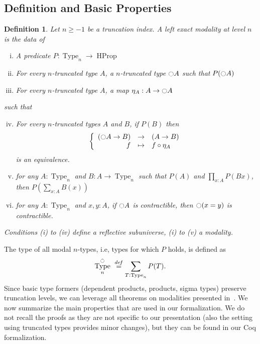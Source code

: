 \documentclass[conference]{IEEEtran}
\newtheorem{defi}[thm]{Definition}
\newcommand \defeq {\overset{de\hspace{-0.2ex}f}{=}}
\newcommand{\ie}{i.e,\xspace}
\DeclareMathOperator{\Type}{Type}
\DeclareMathOperator{\HProp}{HProp}
\newcommand{\modal}{\ensuremath{\ocircle}}
\begin{document}
\subsection{Definition and Basic Properties}
\label{sec:definition}

\begin{defi}
  \label{sec:defin-basic-prop-1}
  Let $n\geq -1$ be a truncation index. A left exact modality at level
  $n$ is the data of
  \begin{enumerate}[(i)]
  \item A predicate $P:\Type_n \to \HProp$
  \item For every $n$-truncated type $A$, a $n$-truncated type
    $\modal A$ such that $P(\modal A)$
  \item For every $n$-truncated type $A$, a map $\eta_A:A \to
    \modal A$
  \end{enumerate}
  such that
  \begin{enumerate}[(i)]
    \setcounter{enumi}{3}
  \item For every $n$-truncated types $A$ and $B$, if $P(B)$ then
    $$\left\{
      \begin{array}{rcl}
        (\modal A \to B) & \to & (A \to B) \\
        f & \mapsto & f \circ \eta_A
      \end{array} \right.$$
    is an equivalence.
  \item for any $A:\Type_n$ and $B:A \to \Type_n$ such that $P(A)$
    and $\prod_{x:A} P(B x)$, then $P\left( \sum_{x:A} B(x)\right)$
  \item for any $A:\Type_n$ and $x,y:A$, if $\modal A$ is
    contractible, then $\modal (x=y)$ is contractible.
  \end{enumerate}
  Conditions (i) to (iv) define a {\em reflective subuniverse}, (i) to
  (v) a {\em modality}.
\end{defi}

The type of all modal $n$-types, \ie types for which $P$ holds, is
defined as %
$$
\Type_n^\modal \ \defeq \sum_{T : \Type_n} P (T).
$$
%
Since basic type formers (dependent products, products, sigma types)
preserve truncation levels, we can leverage all theorems on modalities
presented in~\cite[Chapter 7.7]{hottbook}.
%
We now summarize the main properties that are used in our
formalization. We do not recall the proofs as they are not specific to
our presentation (also the setting using truncated types provides
minor changes), but they can be found in our Coq formalization. 
 
\end{document}
